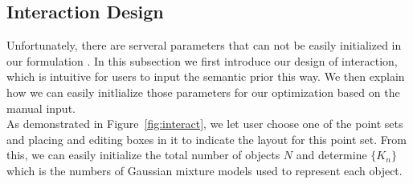 \subsection{Interaction Design}
Unfortunately, there are serveral parameters that can not be easily initialized in our formulation . In this subsection we first introduce our design of interaction, which is intuitive for users to input the semantic prior this way. We then explain how we can easily initlialize those parameters for our optimization based on the manual input.\\
As demonstrated in Figure~\ref{fig:interact}, we let user choose one of the point sets and placing and editing boxes in it to indicate the layout for this point set. From this, we can easily initialize the total number of objects $N$ and determine $\{K_n\}$ which is the numbers of Gaussian mixture models used to represent each object.
